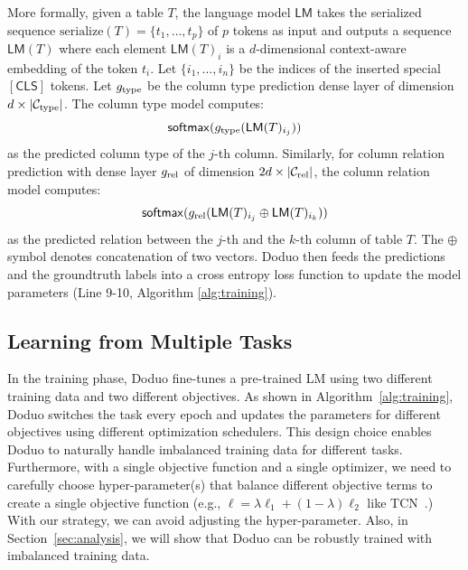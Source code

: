 \documentclass[sigconf]{acmart}
\newcommand{\name}{\mbox{\sc Doduo}}
\newcommand{\rev}[1]{#1}
\begin{document}
\rev{
More formally, given a table $T$,
the language model $\mathsf{LM}$ takes the serialized sequence
$\text{serialize}(T) = \{t_1, \dots, t_p \}$ of $p$ tokens as input
and outputs a sequence $\mathsf{LM}(T)$ where each element
$\mathsf{LM}(T)_i$ is a $d$-dimensional context-aware
embedding of the token $t_i$. 
Let $\{i_1, \dots, i_n\}$ be the indices of the inserted 
special $\mathsf{[CLS]}$ tokens. 
Let $g_{\rm type}$ be the column type prediction dense layer of dimension $d \times |\mathcal{C}_{\rm type}|$.
The column type model computes:
{
\setlength\abovedisplayskip{2pt}
\setlength\belowdisplayskip{2pt}
\begin{equation}
 \mathsf{softmax}( g_{\rm type} ( \mathsf{LM}(T)_{i_j} ) )   
\end{equation}
}
\noindent
as the predicted column type 
of the $j$-th column.
Similarly, for column relation prediction with dense layer
$g_{\rm rel}$  of dimension $2d \times |\mathcal{C}_{\rm rel}|$,
the column relation model computes:
{
\setlength\abovedisplayskip{2pt}
\setlength\belowdisplayskip{2pt}
\begin{equation}
 \mathsf{softmax}( g_{\rm rel} ( \mathsf{LM}(T)_{i_j} \oplus \mathsf{LM}(T)_{i_k} ) )   
\end{equation}
}
\noindent
as the predicted relation between the $j$-th and the $k$-th column
of table $T$. The $\oplus$ symbol denotes concatenation of two vectors.
\name{} then feeds the predictions and the groundtruth labels
into a cross entropy loss function to update the model parameters
(Line 9-10, Algorithm \ref{alg:training}).

}

\subsection{Learning from Multiple Tasks}
In the training phase, \name{} fine-tunes a pre-trained LM using two different training data and two different objectives. As shown in Algorithm~\ref{alg:training}, \name{} switches the task every epoch and updates the parameters for different objectives using different optimization schedulers.
%
This design choice enables \name{} to naturally handle imbalanced training data for different tasks. \rev{Furthermore, with a single objective function and a single optimizer, we need to carefully choose hyper-parameter(s) that balance different objective terms to create a single objective function (e.g., $\ell = \lambda \ell_1 + (1-\lambda) \ell_2$ like TCN~\cite{Wang:2021:TCN}.) With our strategy, we can avoid adjusting the hyper-parameter.}
%
Also, in Section~\ref{sec:analysis}, we will show that \name{} can be robustly trained with imbalanced training data.
\end{document}
